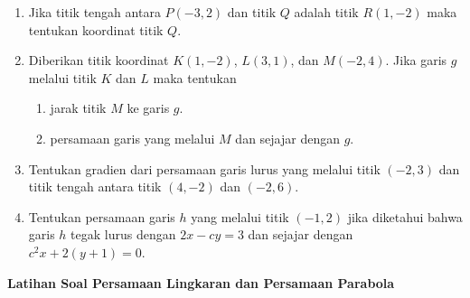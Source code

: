 \documentclass[12pt]{article}
\begin{document}
\begin{enumerate}
    \item Jika titik tengah antara $P(-3, 2)$ dan titik $Q$ adalah titik $R(1, -2)$ maka tentukan koordinat titik $Q$.
    
    \item Diberikan titik koordinat $K(1, -2)$, $L(3, 1)$, dan $M(-2, 4)$. Jika garis $g$ melalui titik $K$ dan $L$ maka tentukan
    \begin{enumerate}
        \item jarak titik $M$ ke garis $g$.
        \item persamaan garis yang melalui $M$ dan sejajar dengan $g$.
    \end{enumerate}
    
    \item Tentukan gradien dari persamaan garis lurus yang melalui titik $(-2, 3)$ dan titik tengah antara titik $(4, -2)$ dan $(-2, 6)$.
    
    \item Tentukan persamaan garis $h$ yang melalui titik $(-1, 2)$ jika diketahui bahwa garis $h$ tegak lurus dengan $2x - cy = 3$ dan sejajar dengan $c^2x + 2(y+1) = 0$.
\end{enumerate}

\vspace{0.5cm}

\noindent \Large \textbf{Latihan Soal Persamaan Lingkaran dan Persamaan Parabola}
\normalsize
\end{document}
